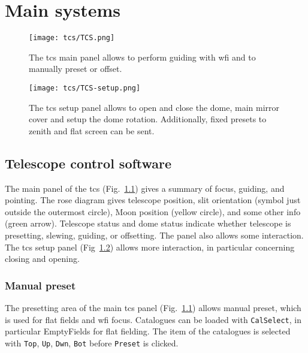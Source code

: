 \documentclass[11pt,fleqn]{book} %
\begin{document}


\chapter{Main systems}
\label{compo}


\begin{figure}[!ht]
\centering
\texttt{[image: tcs/TCS.png]}
\caption[Main panel of the telescope control software]{The \gls{tcs} main panel allows to perform guiding with \gls{wfi} and to manually preset or offset.}
\label{fig:tcs}
\end{figure}

\begin{figure}[!ht]
\centering
\texttt{[image: tcs/TCS-setup.png]}
\caption[Setup panel of the telescope control software]{The \gls{tcs} setup panel allows to open and close the dome, main
mirror cover and setup the dome rotation.  Additionally, fixed presets
to zenith and flat screen can be sent.}
\label{fig:tcssetup}
\end{figure}

\section{Telescope control software}

The main panel of the \gls{tcs} (Fig.~\ref{fig:tcs}) gives a summary of focus,
guiding, and pointing. The rose diagram gives telescope position, slit
orientation (symbol just outside the outermost circle), Moon position (yellow
circle), and some other info (green arrow). Telescope status and dome status
indicate whether telescope is presetting, slewing, guiding, or offsetting.  The
panel also allows some interaction.  The \gls{tcs} setup panel
(Fig~\ref{fig:tcssetup}) allows more interaction, in particular concerning
closing and opening.

\subsection{Manual preset}  
\label{manualpreset}


The presetting area  of the main \gls{tcs} panel (Fig.~\ref{fig:tcs}) allows manual
preset, which is used for flat fields and \gls{wfi} focus.  Catalogues can be loaded
with \texttt{CalSelect}, in particular EmptyFields for flat fielding. The item
of the catalogues is selected with \texttt{Top}, \texttt{Up}, \texttt{Dwn},
\texttt{Bot} before \texttt{Preset} is clicked.
\end{document}
